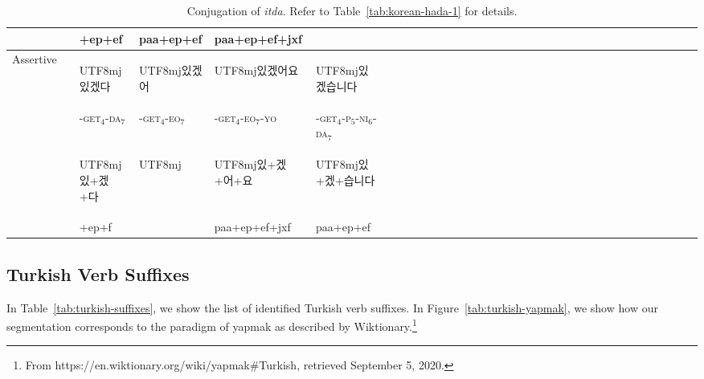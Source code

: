 \documentclass[11pt,letterpaper]{article}
\newcommand{\korean}[1]{\begin{CJK}{UTF8}{mj}#1\end{CJK}}
\begin{document}
\begin{table}[]
\begin{tabular}{llllllllllllllllllllllllllllllllll}
         &  & +ep+ef & paa+ep+ef &  paa+ep+ef+jxf\\
         \hline
\multirow{3}{*}{Assertive} &  & \korean{있겠다} & \korean{있겠어} & \korean{있겠어요} & \korean{있겠습니다} \\
&& -\textsc{get}$_4$-\textsc{da}$_7$ & -\textsc{get}$_4$-\textsc{eo}$_7$ & -\textsc{get}$_4$-\textsc{eo}$_7$-\textsc{yo} & -\textsc{get}$_4$-\textsc{p}$_5$-\textsc{ni}$_6$-\textsc{da}$_7$ \\
         &  & \korean{있+겠+다} & \korean{} & \korean{있+겠+어+요} & \korean{있+겠+습니다}\\
         &  & +ep+f             &           & paa+ep+ef+jxf & paa+ep+ef\\
    \end{tabular}
    \caption{Conjugation of \textit{itda}. Refer to Table~\ref{tab:korean-hada-1} for details.}
    \label{tab:kroean-itda}
\end{table}





\subsection{Turkish Verb Suffixes}

In Table~\ref{tab:turkish-suffixes}, we show the list of identified Turkish verb suffixes.
In Figure~\ref{tab:turkish-yapmak}, we show how our segmentation corresponds to the paradigm of yapmak as described by Wiktionary.\footnote{From https://en.wiktionary.org/wiki/yapmak\#Turkish, retrieved September 5, 2020.}
\end{document}
